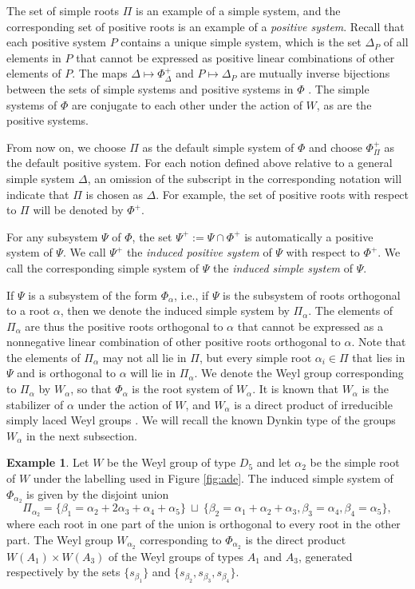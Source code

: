 \documentclass[11pt]{amsart}
\theoremstyle{plain}
\theoremstyle{definition}
\newtheorem{exa}[theorem]{Example}
\theoremstyle{remark}
\numberwithin{equation}{subsection}
\newcommand{\al}{\alpha}
\newcommand{\be}{\beta}
\begin{document}
The set of simple roots $\Pi$ is an example of a simple system, and the
corresponding set of positive roots is an example of a \emph{positive system}.
Recall that each positive system $P$ contains a unique simple system, which is
the set $\Delta_P$ of all elements in $P$ that cannot be expressed as positive
linear combinations of other elements of $P$. The maps $\Delta\mapsto
\Phi_\Delta^+$ and $P\mapsto \Delta_P$ are mutually inverse bijections between
the sets of simple systems and positive systems in $\Phi$ \cite[Theorem
1.3]{humphreys90}. The simple systems of $\Phi$ are conjugate to each other
under the action of $W$, as are the positive systems.

From now on, we choose $\Pi$ as the default simple system of $\Phi$ and choose
$\Phi^+_\Pi$ as the default positive system. For each notion defined above
relative to a general simple system $\Delta$, an omission of the subscript in
the corresponding notation will indicate that $\Pi$ is chosen as $\Delta$.  For
example, the set of positive roots with respect to $\Pi$ will be denoted by
$\Phi^+$.

For any subsystem $\Psi$ of $\Phi$, the set $\Psi^+:=\Psi\cap\Phi^+$ is
automatically a positive system of $\Psi$. We call $\Psi^+$ the \emph{induced
positive system} of $\Psi$ with respect to $\Phi^+$. We call the corresponding
simple system of $\Psi$ the \emph{induced simple system} of $\Psi$. 

If $\Psi$ is a subsystem of the form $\Phi_\al$, i.e., if $\Psi$ is the
subsystem of roots orthogonal to a root $\al$, then we denote the induced simple
system by $\Pi_\al$. The elements of $\Pi_\al$ are thus the positive roots
orthogonal to $\al$ that cannot be expressed as a nonnegative linear combination
of other positive roots orthogonal to $\al$. Note that the elements of $\Pi_\al$
may not all lie in $\Pi$, but every simple root $\al_i\in \Pi$ that lies in $\Psi$ and is
orthogonal to $\al$ will lie in $\Pi_\al$. We denote the Weyl group corresponding to
$\Pi_\al$ by $W_\al$, so that $\Phi_\al$ is the root system of $W_\al$. It is
known that $W_\al$ is the stabilizer of $\al$ under the action of $W$, and
$W_\al$ is a direct product of irreducible simply laced Weyl groups
\cite{brink96,allcock13}. We will recall the known Dynkin type of the groups
$W_\al$ in the next subsection.

\begin{exa}\label{exa:d5}
Let $W$ be the Weyl group of type $D_5$ and let $\al_2$ be the simple root of
$W$ under the labelling used in Figure \ref{fig:ade}. The induced simple system
of $\Phi_{\al_2}$ is given by the disjoint union $$ \Pi_{\al_2}=\{\be_1=\al_2 + 2\al_3 +
\al_4 + \al_5\} \ \sqcup \ \{\be_2=\al_1 + \al_2 + \al_3, \be_3=\al_4,
\be_4=\al_5\},$$ 
where each root in one part of the union is orthogonal to every root in the other part. 
The Weyl group $W_{\al_2}$ corresponding to $\Phi_{\al_2}$ is the direct product
$W(A_1)\times W(A_3)$ of the Weyl groups of types $A_1$ and $A_3$, generated
respectively by the sets $\{s_{\be_1}\}$ and $\{s_{\be_2}, s_{\be_3},
s_{\be_4}\}$.
\end{exa}
\end{document}
